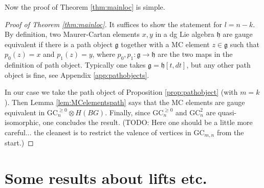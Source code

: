 \documentclass[a4paper]{amsart}
\theoremstyle{plain}
\theoremstyle{definition}
\newcommand{\alg}[1]{\mathfrak{{#1}}}
\newcommand{\fGCc}{\GC^{\geq 0}}
\newcommand{\GC}{\mathrm{GC}}
\begin{document}
Now the proof of Theorem \ref{thm:mainloc} is simple.

\begin{proof}[Proof of Theorem \ref{thm:mainloc}]
It suffices to show the statement for $l=n-k$.
By definition, two Maurer-Cartan elements $x,y$ in a dg Lie algebra $\alg h$ are gauge equivalent if there is a path object $\alg g$ together with a MC element $z\in \alg g$ such that $p_0(z)=x$ and $p_1(z)=y$, where $p_0,p_1:\alg g\to \alg h$ are the two maps in the definition of path object.
Typically one takes $\alg g=\alg h[t,dt]$, but any other path object is fine, see Appendix \ref{app:pathobjects}.

In our case we take the path object of Proposition \ref{prop:pathobject} (with $m=k$).
Then Lemma \ref{lem:MCelementspath} says that the MC elements are gauge equivalent in $\fGCc_n\otimes H(BG)$.
Finally, since $\fGCc_n$ and $\GC_n^{2}$ are quasi-isomorphic, one concludes the result.
(TODO: Here one should be a little more careful... the cleanest is to restrict the valence of vertices in $\GC_{m,n}$ from the start.) 
\end{proof}

\appendix

\section{Some results about lifts etc.}
\end{document}
